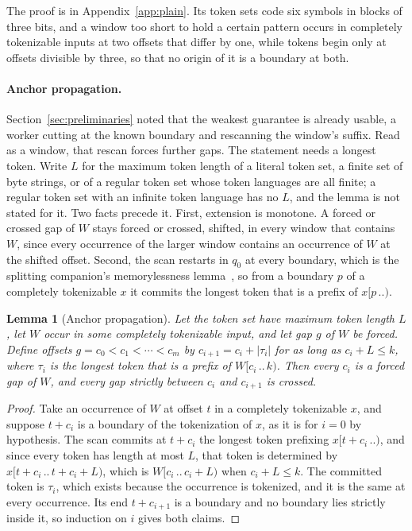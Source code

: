 \documentclass[11pt,a4paper]{article}
\theoremstyle{definition}
\theoremstyle{plain}
\newtheorem{lemma}{Lemma}
\begin{document}
The proof is in Appendix~\ref{app:plain}. Its token sets code six symbols in blocks of three bits, and a window too
short to hold a certain pattern occurs in completely tokenizable inputs at two offsets that differ by one, while tokens
begin only at offsets divisible by three, so that no origin of it is a boundary at both.


\paragraph{Anchor propagation.} Section~\ref{sec:preliminaries} noted that the weakest guarantee is already usable, a
worker cutting at the known boundary and rescanning the window's suffix. Read as a window, that rescan forces further
gaps. The statement needs a longest token. Write $L$ for the maximum token length of a literal token set, a finite set
of byte strings, or of a regular token set whose token languages are all finite; a regular token set with an infinite
token language has no $L$, and the lemma is not stated for it. Two facts precede it. First, extension is monotone. A
forced or crossed gap of $W$ stays forced or crossed, shifted, in every window that contains $W$, since every occurrence
of the larger window contains an occurrence of $W$ at the shifted offset. Second, the scan restarts in $q_0$ at every
boundary, which is the splitting companion's memorylessness lemma~\cite{nidhogg2026splitting}, so from a boundary $p$ of
a completely tokenizable $x$ it commits the longest token that is a prefix of $x[p \,..)$.

\begin{lemma}[Anchor propagation]
\label{lem:propagation}
Let the token set have maximum token length $L$, let $W$ occur in some completely tokenizable input, and let gap $g$ of
$W$ be forced. Define offsets $g = c_0 < c_1 < \cdots < c_m$ by $c_{i+1} = c_i + |\tau_i|$ for as long as
$c_i + L \leq k$, where $\tau_i$ is the longest token that is a prefix of $W[c_i \,..\, k)$. Then every $c_i$ is a
forced gap of $W$, and every gap strictly between $c_i$ and $c_{i+1}$ is crossed.
\end{lemma}

\begin{proof}
Take an occurrence of $W$ at offset $t$ in a completely tokenizable $x$, and suppose $t + c_i$ is a boundary of the
tokenization of $x$, as it is for $i = 0$ by hypothesis. The scan commits at $t + c_i$ the longest token prefixing
$x[t + c_i \,..)$, and since every token has length at most $L$, that token is determined by
$x[t + c_i \,..\, t + c_i + L)$, which is $W[c_i \,..\, c_i + L)$ when $c_i + L \leq k$. The committed token is
$\tau_i$, which exists because the occurrence is tokenized, and it is the same at every occurrence. Its end
$t + c_{i+1}$ is a boundary and no boundary lies strictly inside it, so induction on $i$ gives both claims.
\end{proof}
\end{document}
